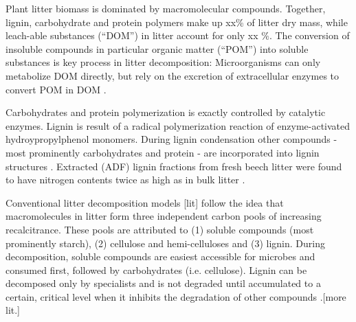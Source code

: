 



Plant litter biomass is dominated by macromolecular compounds. Together, lignin, carbohydrate and protein polymers make up xx\% of litter dry mass, while leach-able substances (``DOM'') in litter account for only xx \%. The conversion of insoluble compounds in particular organic matter (``POM'') into soluble substances is key process in litter decomposition: Microorganisms can only metabolize DOM directly, but rely on the excretion of extracellular enzymes to convert POM in DOM \citep{Klotzbucher2011,Bengtson2007,Marschner2003}.

Carbohydrates and protein polymerization is exactly controlled by catalytic enzymes. Lignin is result of a radical polymerization reaction of enzyme-activated hydroypropylphenol monomers. During lignin condensation other compounds - most prominently carbohydrates and protein - are incorporated into lignin structures \citep{Achyuthan2010}. Extracted (ADF) lignin fractions from fresh beech litter were found to have nitrogen contents twice as high as in bulk litter \citep{Dyckmans2002}. 

Conventional litter decomposition models [lit] follow the idea that macromolecules in litter form three independent carbon pools of increasing recalcitrance. These pools are attributed to (1) soluble compounds (most prominently starch), (2) cellulose and hemi-celluloses and (3) lignin. During decomposition, soluble compounds are easiest accessible for microbes and consumed first, followed by carbohydrates (i.e. cellulose). Lignin can be decomposed only by specialists and is not degraded until accumulated to a certain, critical level when it inhibits the degradation of other compounds \citep{Berg1980, Couteaux1995, Moorhead2006}.[more lit.] 


